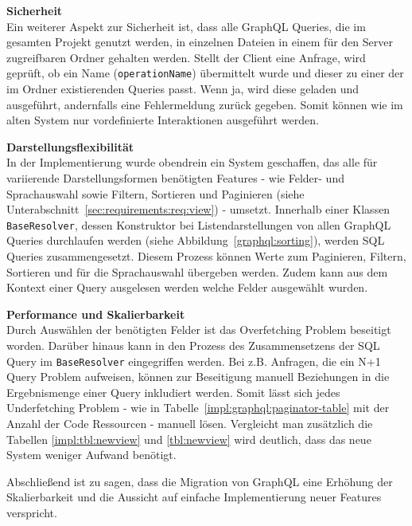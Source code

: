 \textbf{Sicherheit} \ \\
Ein weiterer Aspekt zur Sicherheit ist, dass alle GraphQL Queries, die im gesamten Projekt genutzt werden, in einzelnen Dateien in einem für den Server zugreifbaren Ordner gehalten werden. 
Stellt der Client eine Anfrage, wird geprüft, ob ein Name (\texttt{operationName}) übermittelt wurde und dieser zu einer der im Ordner existierenden Queries passt. Wenn ja, wird diese geladen und ausgeführt, andernfalls eine Fehlermeldung zurück gegeben. Somit können wie im alten System nur vordefinierte Interaktionen ausgeführt werden.

\textbf{Darstellungsflexibilität} \ \\
In der Implementierung wurde obendrein ein System geschaffen, das alle für variierende Darstellungsformen benötigten Features - wie Felder- und Sprachauswahl sowie Filtern, Sortieren und Paginieren (siehe Unterabschnitt~\ref{sec:requirements:req:view}) - umsetzt. Innerhalb einer Klassen \texttt{BaseResolver}, dessen Konstruktor bei Listendarstellungen von allen GraphQL Queries durchlaufen werden (siehe Abbildung~\ref{graphql:sorting}), werden SQL Queries zusammengesetzt. Diesem Prozess können Werte zum Paginieren, Filtern, Sortieren und für die Sprachauswahl übergeben werden. Zudem kann aus dem Kontext einer Query ausgelesen werden welche Felder ausgewählt wurden.

\textbf{Performance und Skalierbarkeit} \ \\
Durch Auswählen der benötigten Felder ist das Overfetching Problem beseitigt worden.
Darüber hinaus kann in den Prozess des Zusammensetzens der SQL Query im \texttt{BaseResolver} eingegriffen werden. Bei z.B. Anfragen, die ein N+1 Query Problem aufweisen, können zur Beseitigung manuell Beziehungen in die Ergebnismenge einer Query inkludiert werden. Somit lässt sich jedes Underfetching Problem - wie in Tabelle~\ref{impl:graphql:paginator-table} mit der Anzahl der Code Ressourcen - manuell lösen.
Vergleicht man zusätzlich die Tabellen \ref{impl:tbl:newview} und \ref{tbl:newview} wird deutlich, dass das neue System weniger Aufwand benötigt. 

Abschließend ist zu sagen, dass die Migration von GraphQL eine Erhöhung der Skalierbarkeit und die Aussicht auf einfache Implementierung neuer Features verspricht.

